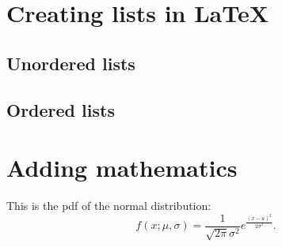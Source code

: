 \documentclass{article}
\begin{document}
\section{Creating lists in \LaTeX}
\subsection{Unordered lists}
\subsection{Ordered lists}

\section{Adding mathematics}
This is the pdf of the normal distribution:
$$f(x; \mu, \sigma) = \frac{1}{\sqrt{2\pi}\sigma^{2}}e^{\frac{(x-u)^{2}}{2\sigma^{2}}}.$$
\end{document}
